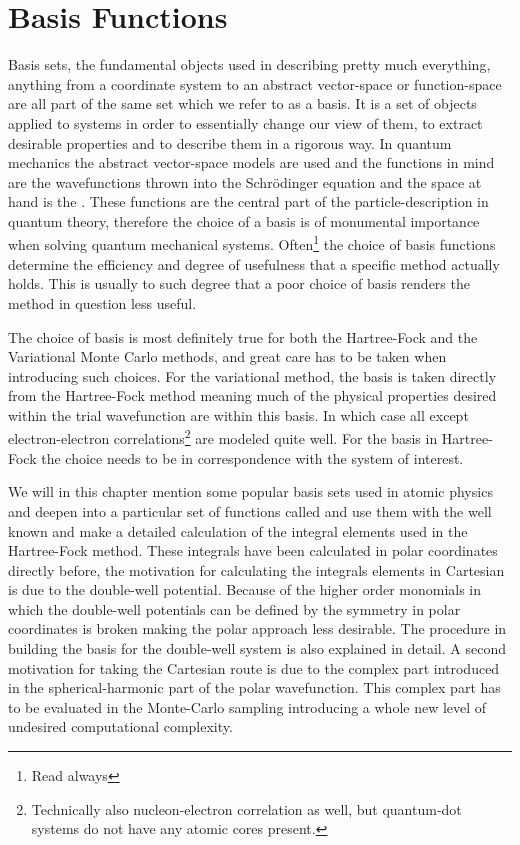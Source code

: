 \chapter{Basis Functions\label{chapter:3}}
    Basis sets, the fundamental objects used in describing pretty much
    everything, anything from a coordinate system to an abstract vector-space
    or function-space are all part of the same set which we refer to as a
    basis. It is a set of objects applied to systems in order to essentially
    change our view of them, to extract desirable properties and to describe
    them in a rigorous way. In quantum mechanics the abstract vector-space
    models are used and the functions in mind are the wavefunctions thrown into
    the Schrödinger equation and the space at hand is the . These functions are the central part of the particle-description
    in quantum theory, therefore the choice of a basis is
    of monumental importance when solving quantum mechanical systems.
    Often\footnote{Read always} the choice of basis functions determine the
    efficiency and degree of usefulness that a specific method actually holds.
    This is usually to such degree that a poor choice of basis renders the
    method in question less useful.

    The choice of basis is most definitely true for both the Hartree-Fock and
    the Variational Monte Carlo methods, and great care has to be taken when
    introducing such choices. For the variational method, the basis is taken
    directly from the Hartree-Fock method meaning much of the physical
    properties desired within the trial wavefunction are within this basis. In
    which case all except electron-electron correlations\footnote{Technically
    also nucleon-electron correlation as well, but quantum-dot systems do not
    have any atomic cores present.} are modeled quite well. For the basis in
    Hartree-Fock the choice needs to be in correspondence with the system of
    interest.

    We will in this chapter mention some popular basis sets used in atomic
    physics and deepen into a particular set of functions called
     and use them with the well known
     and make a detailed calculation of the integral
    elements used in the Hartree-Fock method. These integrals have been
    calculated in polar coordinates directly before\cite{anisimovas}, the
    motivation for calculating the integrals elements in Cartesian is due to
    the double-well potential. Because of the higher order monomials in which
    the double-well potentials can be defined by the symmetry in polar
    coordinates is broken making the polar approach less desirable. The
    procedure in building the basis for the double-well system is also
    explained in detail. A second motivation for taking the Cartesian route is
    due to the complex part introduced in the spherical-harmonic part of the
    polar wavefunction. This complex part has to be evaluated in the
    Monte-Carlo sampling introducing a whole new level of undesired
    computational complexity.

